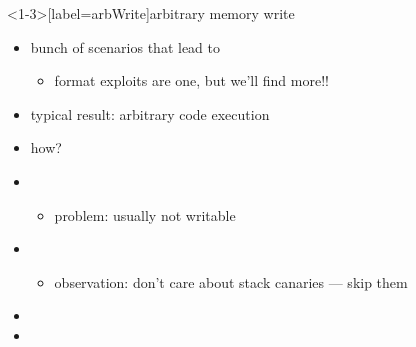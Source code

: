 
\begin{frame}<1-3>[label=arbWrite]{arbitrary memory write}
    \begin{itemize}
    \item bunch of scenarios that lead to 
        \begin{itemize}
        \item format exploits are one, but we'll find more!!
        \end{itemize}
    \item typical result: arbitrary code execution
    \item how?
    \vspace{.5cm}
    \item<2-> 
        \begin{itemize}
        \item problem: usually not writable
        \end{itemize}
    \item<2-> 
        \begin{itemize}
        \item observation: don't care about stack canaries --- skip them
        \end{itemize}
    \item<2-> 
    \item<2-> 
    \end{itemize}
\end{frame}
